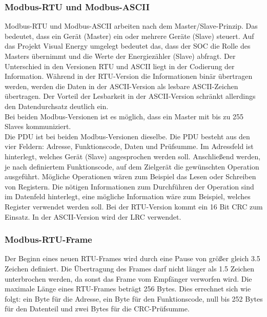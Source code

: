 \documentclass[../Bachelorarbeit.tex]{subfiles}
\begin{document}
\subsubsection*{Modbus-\acs{RTU} und Modbus-\acs{ASCII}}
Modbus-\acs{RTU} und Modbus-\acs{ASCII} arbeiten nach dem Master/Slave-Prinzip. Das bedeutet, dass ein Gerät (Master) ein oder mehrere Geräte (Slave) steuert. Auf das Projekt Visual Energy 
umgelegt bedeutet das, dass der \ac{SOC} die Rolle des Masters übernimmt und die Werte der
Energiezähler (Slave) abfragt. Der Unterschied in den Versionen RTU und ASCII liegt in der Codierung der Information. Während in der RTU-Version die Informationen binär übertragen werden, werden die Daten in der ASCII-Version als lesbare ASCII-Zeichen übertragen. Der Vorteil der Lesbarkeit in der ASCII-Version schränkt allerdings den Datendurchsatz deutlich ein. \\
Bei beiden Modbus-Versionen ist es möglich, dass ein Master mit bis zu 255 Slaves 
kommuniziert.
\parencite[vgl.][S. 208]{bussyteme}\\
Die \ac{PDU} ist bei beiden Modbus-Versionen dieselbe. Die \ac{PDU} besteht 
aus den vier Feldern: Adresse, Funktionscode, Daten und Prüfsumme. Im Adressfeld ist 
hinterlegt, welches Gerät (Slave) angesprochen werden soll. Anschließend werden, je 
nach definiertem Funktionscode, auf dem Zielgerät die gewünschten Operation 
ausgeführt. Mögliche Operationen wären zum Beispiel das Lesen oder Schreiben von 
Registern. Die nötigen Informationen zum Durchführen der Operation sind im Datenfeld 
hinterlegt, eine mögliche Information wäre zum Beispiel, welches Register verwendet werden soll. Bei der RTU-Version kommt ein 16 Bit \ac{CRC} zum Einsatz. In der ASCII-Version wird der \ac{LRC} verwendet. 
\parencite[vgl.][S. 78 ff]{modbus_dipl_arbeit}

\subsubsection*{Modbus-\acs{RTU}-Frame}
\label{para:modbus_rtu}
Der Beginn eines neuen \acs{RTU}-Frames wird durch eine Pause von größer gleich 3.5 
Zeichen definiert. Die Übertragung des Frames darf nicht länger als 1.5 Zeichen 
unterbrochen werden, da sonst das Frame vom Empfänger verworfen wird. Die maximale 
Länge eines \acs{RTU}-Frames beträgt 256 Bytes. Dies errechnet sich wie folgt: ein Byte für die 
Adresse, ein Byte für den Funktionscode, null bis 252 Bytes für den Datenteil und zwei 
Bytes für die \acs{CRC}-Prüfsumme. 
\parencite[vgl.][S. 79]{modbus_dipl_arbeit}
\end{document}
